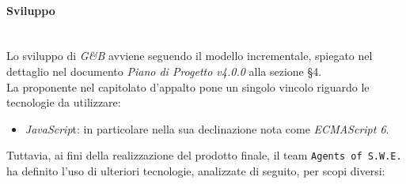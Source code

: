 \paragraph{Sviluppo} \-\\
\label{Progettazione_Sviluppo}
Lo sviluppo di \textit{G\&B} avviene seguendo il modello incrementale, spiegato nel dettaglio nel documento \textit{Piano di Progetto v4.0.0} alla sezione §4.\\
La proponente nel capitolato d'appalto pone un singolo vincolo riguardo le tecnologie da utilizzare:
\begin{itemize}
	\item \textit{JavaScrip}t: in particolare nella sua declinazione nota come \textit{ECMAScript 6}\glossario.
\end{itemize}
Tuttavia, ai fini della realizzazione del prodotto finale, il team \texttt{Agents of S.W.E.} ha definito l'uso di ulteriori tecnologie, analizzate di seguito, per scopi diversi:
